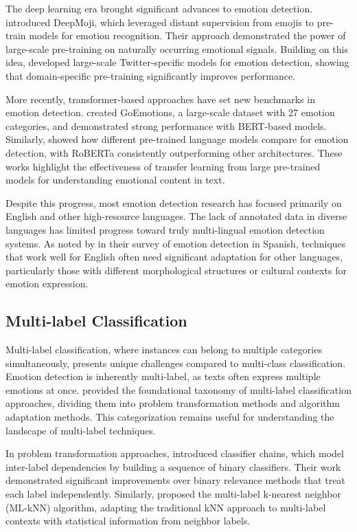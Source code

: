 \documentclass[a4paper,12pt]{extarticle}
\begin{document}
The deep learning era brought significant advances to emotion detection. \cite{felbo2017using} introduced DeepMoji, which leveraged distant supervision from emojis to pre-train models for emotion recognition. Their approach demonstrated the power of large-scale pre-training on naturally occurring emotional signals. Building on this idea, \cite{abdul2017emonet} developed large-scale Twitter-specific models for emotion detection, showing that domain-specific pre-training significantly improves performance.

More recently, transformer-based approaches have set new benchmarks in emotion detection. \cite{demszky2020goemotions} created GoEmotions, a large-scale dataset with 27 emotion categories, and demonstrated strong performance with BERT-based models. Similarly, \cite{zhang2022emotion} showed how different pre-trained language models compare for emotion detection, with RoBERTa consistently outperforming other architectures. These works highlight the effectiveness of transfer learning from large pre-trained models for understanding emotional content in text.

Despite this progress, most emotion detection research has focused primarily on English and other high-resource languages. The lack of annotated data in diverse languages has limited progress toward truly multi-lingual emotion detection systems. As noted by \cite{plaza2020overview} in their survey of emotion detection in Spanish, techniques that work well for English often need significant adaptation for other languages, particularly those with different morphological structures or cultural contexts for emotion expression.

\subsection{Multi-label Classification}

Multi-label classification, where instances can belong to multiple categories simultaneously, presents unique challenges compared to multi-class classification. Emotion detection is inherently multi-label, as texts often express multiple emotions at once. \cite{tsoumakas2007multi} provided the foundational taxonomy of multi-label classification approaches, dividing them into problem transformation methods and algorithm adaptation methods. This categorization remains useful for understanding the landscape of multi-label techniques.

In problem transformation approaches, \cite{read2011classifier} introduced classifier chains, which model inter-label dependencies by building a sequence of binary classifiers. Their work demonstrated significant improvements over binary relevance methods that treat each label independently. Similarly, \cite{zhang2007ml} proposed the multi-label k-nearest neighbor (ML-kNN) algorithm, adapting the traditional kNN approach to multi-label contexts with statistical information from neighbor labels.
\end{document}

